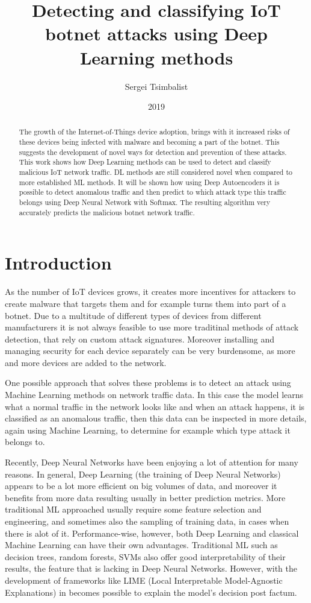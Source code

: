 \documentclass{article}
\title{Detecting and classifying IoT botnet attacks using Deep Learning methods}
\date{2019}
\author{Sergei Tsimbalist}
\begin{document}
\maketitle
{}
\newpage
\begin{abstract}
The growth of the Internet-of-Things device adoption, brings with it increased risks of these devices being infected with malware
and becoming a part of the botnet. This suggests the development of novel ways for detection and prevention of these attacks.
This work shows how Deep Learning methods can be used to detect and classify malicious IoT network traffic. 
DL methods are still considered novel when compared to more established ML methods.
It will be shown how using Deep Autoencoders it is possible to detect anomalous traffic and then predict to which attack type 
this traffic belongs using Deep Neural Network with Softmax. 
The resulting algorithm very accurately predicts the malicious botnet network traffic.

\end{abstract}
\newpage
\tableofcontents

\newpage
{}

\section{Introduction}

As the number of IoT devices grows, it creates more incentives for attackers to create malware that targets them
and for example turns them into part of a botnet. Due to a multitude of different types of devices from different manufacturers
it is not always feasible to use more traditinal methods of attack detection, that rely on custom attack signatures. Moreover installing and managing
security for each device separately can be very burdensome, as more and more devices are added to the network. 

One possible approach that solves these problems is to detect an attack using Machine Learning methods on network traffic data.
In this case the model learns what a normal traffic in the network looks like and when an attack happens, it is classified as an anomalous traffic, then
this data can be inspected in more details, again using Machine Learning, to determine for example which type attack it belongs to.

Recently, Deep Neural Networks have been enjoying a lot of attention for many reasons. In general, Deep Learning (the training of Deep Neural Networks) appears to be
a lot more efficient on big volumes of data, and moreover it benefits from more data resulting usually in better prediction metrics. 
More traditional ML approached usually require some feature selection and engineering, and sometimes also the sampling of training data, in cases when there is alot of it.
Performance-wise, however, both Deep Learning and classical Machine Learning can have their own advantages.
Traditional ML such as decision trees, random forests, SVMs also offer good interpretability of their results, the feature that is lacking in
Deep Neural Networks. However, with the development of frameworks like LIME (Local Interpretable Model-Agnostic Explanations) in becomes possible to
explain the model's decision post factum.  
\end{document}
